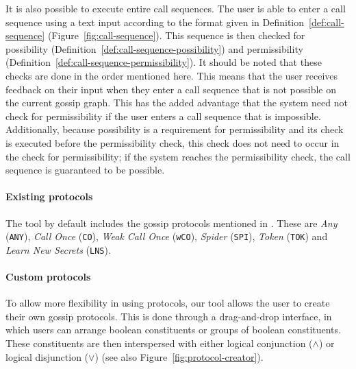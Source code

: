 It is also possible to execute entire call sequences.
The user is able to enter a call sequence using a text input according to the format given in Definition~\ref{def:call-sequence} (Figure~\ref{fig:call-sequence}).
This sequence is then checked for possibility (Definition~\ref{def:call-sequence-possibility}) and permissibility (Definition~\ref{def:call-sequence-permissibility}).
It should be noted that these checks are done in the order mentioned here.
This means that the user receives feedback on their input when they enter a call sequence that is not possible on the current gossip graph.
This has the added advantage that the system need not check for permissibility if the user enters a call sequence that is impossible.
Additionally, because possibility is a requirement for permissibility and its check is executed before the permissibility check, this check does not need to occur in the check for permissibility;
if the system reaches the permissibility check, the call sequence is guaranteed to be possible.

\paragraph{Existing protocols}
\label{sec:existing-protocols}

The tool by default includes the gossip protocols mentioned in \textcite{van_ditmarsch_dynamic_2018}.
These are \emph{Any} (\texttt{ANY}), \emph{Call Once} (\texttt{CO}), \emph{Weak Call Once} (\texttt{wCO}), \emph{Spider} (\texttt{SPI}), \emph{Token} (\texttt{TOK}) and \emph{Learn New Secrets} (\texttt{LNS}).

\paragraph{Custom protocols}
\label{sec:custom-protocols}

To allow more flexibility in using protocols, 
our tool allows the user to create their own gossip protocols.
This is done through a drag-and-drop interface,
in which users can arrange boolean constituents or groups of boolean constituents.
These constituents are then interspersed with either logical conjunction (\(\land\)) or logical disjunction (\(\lor\)) (see also Figure~\ref{fig:protocol-creator}).

